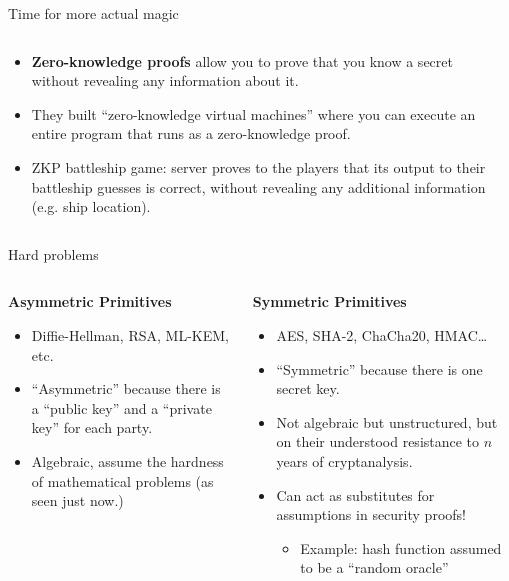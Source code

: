 \documentclass[aspectratio=169, lualatex, handout]{beamer}
\begin{document}
\begin{frame}{Time for more actual magic}
	\begin{columns}[c]
		\begin{column}{0.6\textwidth}
			\begin{itemize}[<+->]
				\item \textbf{Zero-knowledge proofs} allow you to prove that you know
				      a secret without revealing any information about it.
				\item They built ``zero-knowledge virtual machines'' where you can execute
				      an entire program that runs as a zero-knowledge proof.
				\item ZKP battleship game: server proves to the players that its
				      output to their battleship guesses is correct, without revealing any
				      additional information (e.g. ship location).
			\end{itemize}
		\end{column}
		\begin{column}{0.4\textwidth}
		\end{column}
	\end{columns}
\end{frame}

\begin{frame}{Hard problems}
	\begin{columns}[c]
		\begin{column}{0.5\textwidth}
			\textbf{Asymmetric Primitives}
			\begin{itemize}[<+->]
				\item Diffie-Hellman, RSA, ML-KEM, etc.
				\item ``Asymmetric'' because there is a ``public key'' and a ``private
				      key'' for each party.
				\item Algebraic, assume the hardness of mathematical problems (as seen
				      just now.)
			\end{itemize}
		\end{column}

		\begin{column}{0.5\textwidth}
			\textbf{Symmetric Primitives}
			\begin{itemize}[<+->]
				\item AES, SHA-2, ChaCha20, HMAC\ldots
				\item ``Symmetric'' because there is one secret key.
				\item Not algebraic but unstructured, but on their understood
				      resistance to $n$ years of cryptanalysis.
				\item Can act as substitutes for assumptions in security proofs!
				      \begin{itemize}
					      \item Example: hash function assumed to be a ``random oracle''
				      \end{itemize}
			\end{itemize}
		\end{column}
	\end{columns}
\end{frame}
\end{document}
